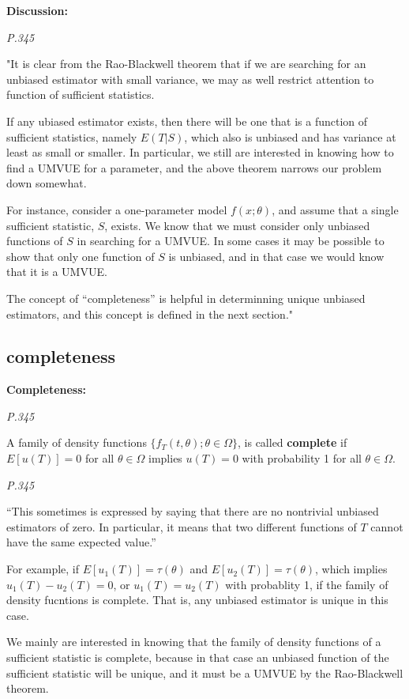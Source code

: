 \documentclass[]{book}
\begin{document}
\textbf{Discussion:}

\emph{P.345}

"It is clear from the Rao-Blackwell theorem that if we are searching for an unbiased estimator with small variance, we may as well restrict attention to function of sufficient statistics.

If any ubiased estimator exists, then there will be one that is a function of sufficient statistics, namely \(E(T|S)\), which also is unbiased and has variance at least as small or smaller. In particular, we still are interested in knowing how to find a UMVUE for a parameter, and the above theorem narrows our problem down somewhat.

For instance, consider a one-parameter model \(f(x;\theta)\), and assume that a single sufficient statistic, \(S\), exists. We know that we must consider only unbiased functions of \(S\) in searching for a UMVUE. In some cases it may be possible to show that only one function of \(S\) is unbiased, and in that case we would know that it is a UMVUE.

The concept of ``completeness'' is helpful in determinning unique unbiased estimators, and this concept is defined in the next section."

\hypertarget{completeness}{%
\subsection{completeness}\label{completeness}}

\textbf{Completeness:}

\emph{P.345}

A family of density functions \(\{ f_T(t,\theta); \theta \in \Omega\}\), is called \textbf{complete} if \(E[u(T)]=0\) for all \(\theta \in \Omega\) implies \(u(T)=0\) with probability 1 for all \(\theta \in \Omega\).

\emph{P.345}

``This sometimes is expressed by saying that there are no nontrivial unbiased estimators of zero. In particular, it means that two different functions of \(T\) cannot have the same expected value.''

For example, if \(E[u_1(T)]=\tau(\theta)\) and \(E[u_2(T)]=\tau(\theta)\), which implies \(u_1(T)-u_2(T)=0\), or \(u_1(T)=u_2(T)\) with probablity 1, if the family of density fucntions is complete. That is, any unbiased estimator is unique in this case.

We mainly are interested in knowing that the family of density functions of a sufficient statistic is complete, because in that case an unbiased function of the sufficient statistic will be unique, and it must be a UMVUE by the Rao-Blackwell theorem.
\end{document}
